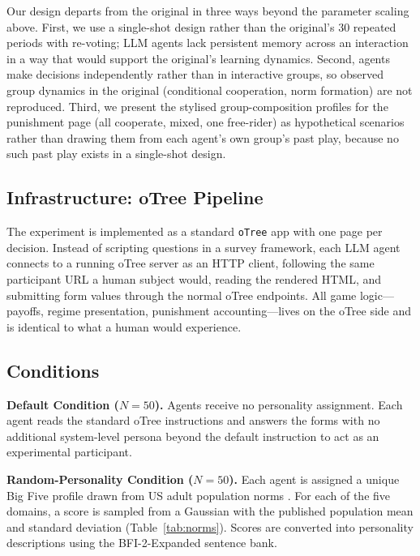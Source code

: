 \documentclass[12pt, a4paper]{article}
\begin{document}
Our design departs from the original in three ways beyond the parameter scaling above. First, we use a single-shot design rather than the original's $30$ repeated periods with re-voting; LLM agents lack persistent memory across an interaction in a way that would support the original's learning dynamics. Second, agents make decisions independently rather than in interactive groups, so observed group dynamics in the original (conditional cooperation, norm formation) are not reproduced. Third, we present the stylised group-composition profiles for the punishment page (all cooperate, mixed, one free-rider) as hypothetical scenarios rather than drawing them from each agent's own group's past play, because no such past play exists in a single-shot design.

\subsection{Infrastructure: oTree Pipeline}

The experiment is implemented as a standard \texttt{oTree} app \citep{otree} with one page per decision. Instead of scripting questions in a survey framework, each LLM agent connects to a running oTree server as an HTTP client, following the same participant URL a human subject would, reading the rendered HTML, and submitting form values through the normal oTree endpoints. All game logic---payoffs, regime presentation, punishment accounting---lives on the oTree side and is identical to what a human would experience.

\subsection{Conditions}

\textbf{Default Condition ($N=50$).} Agents receive no personality assignment. Each agent reads the standard oTree instructions and answers the forms with no additional system-level persona beyond the default instruction to act as an experimental participant.

\textbf{Random-Personality Condition ($N=50$).} Each agent is assigned a unique Big Five profile drawn from US adult population norms \citep{soto2017bfi2, srivastava2003development}. For each of the five domains, a score is sampled from a Gaussian with the published population mean and standard deviation (Table~\ref{tab:norms}). Scores are converted into personality descriptions using the BFI-2-Expanded sentence bank.
\end{document}
